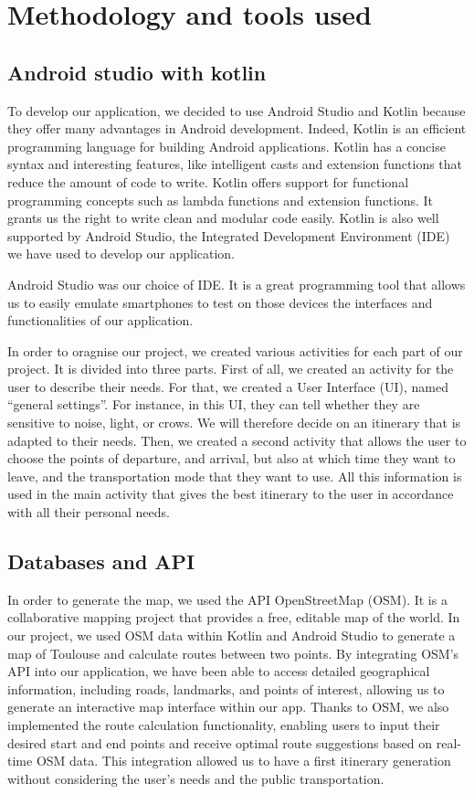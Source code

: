 \section{Methodology and tools used}


\subsection{Android studio with kotlin}


To develop our application, we decided to use Android Studio and Kotlin because they offer many advantages in Android development. Indeed, Kotlin is an efficient programming language for building Android applications. Kotlin has a concise syntax and interesting features, like intelligent casts and extension functions that reduce the amount of code to write. Kotlin offers support for functional programming concepts such as lambda functions and extension functions. It grants us the right to write clean and modular code easily. Kotlin is also well supported by Android Studio, the Integrated Development Environment (IDE) we have used to develop our application.


Android Studio was our choice of IDE. It is a great programming tool that allows us to easily emulate smartphones to test on those devices the interfaces and functionalities of our application.


In order to oragnise our project, we created various activities for each part of our project. It is divided into three parts. First of all, we created an activity for the user to describe their needs. For that, we created a User Interface (UI), named “general settings”. For instance, in this UI, they can tell whether they are sensitive to noise, light, or crows. We will therefore decide on an itinerary that is adapted to their needs. Then, we created a second activity that allows the user to choose the points of departure, and arrival, but also at which time they want to leave, and the transportation mode that they want to use. All this information is used in the main activity that gives the best itinerary to the user in accordance with all their personal needs.


\subsection{Databases and API}


In order to generate the map, we used the API OpenStreetMap (OSM). It is a collaborative mapping project that provides a free, editable map of the world. In our project, we used OSM data within Kotlin and Android Studio to generate a map of Toulouse and calculate routes between two points. By integrating OSM's API into our application, we have been able to access detailed geographical information, including roads, landmarks, and points of interest, allowing us to generate an interactive map interface within our app. Thanks to OSM, we also implemented the route calculation functionality, enabling users to input their desired start and end points and receive optimal route suggestions based on real-time OSM data. This integration allowed us to have a first itinerary generation without considering the user’s needs and the public transportation.


